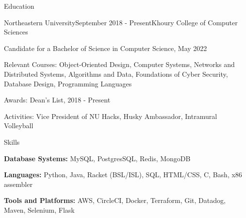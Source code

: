 \documentclass{resume}
\begin{document}
\begin{rSection}{Education}
\begin{rSubsection}{Northeastern University}{September 2018 - Present}{Khoury College of Computer Sciences}{}
\item Candidate for a Bachelor of Science in Computer Science, May 2022
\item Relevant Courses: Object-Oriented Design, Computer Systems, Networks and Distributed Systems,  Algorithms and Data, Foundations of Cyber Security, Database Design, Programming Languages
\item Awards: Dean's List, 2018 - Present
\item Activities: Vice President of NU Hacks, Husky Ambassador, Intramural Volleyball
\end{rSubsection}

\end{rSection}

\begin{rSection}{Skills}
  \begin{list}{\tiny\raisebox{1ex}{\textbullet}}{\leftmargin=2.0em}
    \item {\bf Database Systems:} MySQL, PostgresSQL, Redis, MongoDB
    \item {\bf Languages:} Python, Java, Racket (BSL/ISL), SQL, HTML/CSS, C, Bash, x86 assembler 
    \item {\bf Tools and Platforms:} AWS, CircleCI, Docker, Terraform, Git, Datadog, Maven, Selenium, Flask
  \end{list}
\end{rSection}
\end{document}
